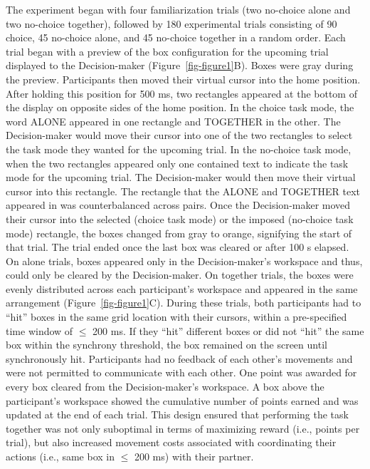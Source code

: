 \documentclass[
  11pt,
  letterpaper,
]{article}
\begin{document}
The experiment began with four familiarization trials (two no-choice
alone and two no-choice together), followed by 180 experimental trials
consisting of 90 choice, 45 no-choice alone, and 45 no-choice together
in a random order. Each trial began with a preview of the box
configuration for the upcoming trial displayed to the Decision-maker
(Figure~\ref{fig-figure1}B). Boxes were gray during the preview.
Participants then moved their virtual cursor into the home position.
After holding this position for 500 ms, two rectangles appeared at the
bottom of the display on opposite sides of the home position. In the
choice task mode, the word ALONE appeared in one rectangle and TOGETHER
in the other. The Decision-maker would move their cursor into one of the
two rectangles to select the task mode they wanted for the upcoming
trial. In the no-choice task mode, when the two rectangles appeared only
one contained text to indicate the task mode for the upcoming trial. The
Decision-maker would then move their virtual cursor into this rectangle.
The rectangle that the ALONE and TOGETHER text appeared in was
counterbalanced across pairs. Once the Decision-maker moved their cursor
into the selected (choice task mode) or the imposed (no-choice task
mode) rectangle, the boxes changed from gray to orange, signifying the
start of that trial. The trial ended once the last box was cleared or
after 100 s elapsed. On alone trials, boxes appeared only in the
Decision-maker's workspace and thus, could only be cleared by the
Decision-maker. On together trials, the boxes were evenly distributed
across each participant's workspace and appeared in the same arrangement
(Figure~\ref{fig-figure1}C). During these trials, both participants had
to ``hit'' boxes in the same grid location with their cursors, within a
pre-specified time window of \(\leq\) 200 ms. If they ``hit'' different
boxes or did not ``hit'' the same box within the synchrony threshold,
the box remained on the screen until synchronously hit. Participants had
no feedback of each other's movements and were not permitted to
communicate with each other. One point was awarded for every box cleared
from the Decision-maker's workspace. A box above the participant's
workspace showed the cumulative number of points earned and was updated
at the end of each trial. This design ensured that performing the task
together was not only suboptimal in terms of maximizing reward (i.e.,
points per trial), but also increased movement costs associated with
coordinating their actions (i.e., same box in \(\leq\) 200 ms) with
their partner.
\end{document}
